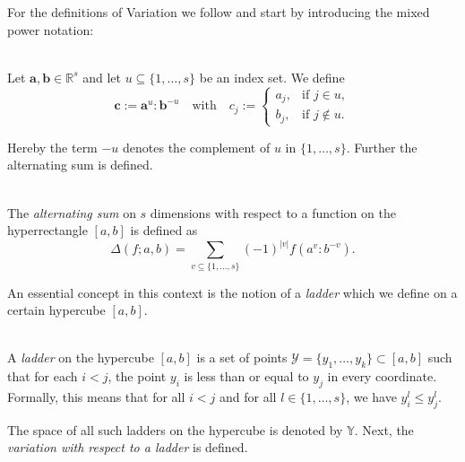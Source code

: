 For the definitions of Variation we follow \cite{owen2005multidimensional} and
start by introducing the mixed power notation:

\begin{definition} \ \\
    \label{def:component_merge}
    Let $\boldsymbol{a}, \boldsymbol{b} \in \mathbb{R}^s$ and let $u \subseteq
    \{1, \dots, s\}$ be an index set. We define
    \begin{equation*}
        \boldsymbol{c} := \boldsymbol{a}^u : \boldsymbol{b}^{-u}
        \quad \text{with} \quad
        c_j := 
        \begin{cases}
            a_j, & \text{if } j \in u, \\
            b_j, & \text{if } j \notin u.
        \end{cases}
    \end{equation*}
\end{definition}

Hereby the term $-u$ denotes the complement of $u$ in $\{1, \dots, s\}$. Further
the alternating sum is defined.

\begin{definition} \ \\
    The \emph{alternating sum} on $s$ dimensions with respect to a function on
    the hyperrectangle $[a,b]$ is defined as
    \begin{equation*}
        \Delta(f; a, b) = \sum_{v \subseteq \{1,\dots,s\}} (-1)^{|v|} f(a^v:b^{-v}).
    \end{equation*}
\end{definition}

An essential concept in this context is the notion of a \emph{ladder} which we
define on a certain hypercube $[a,b]$.

\begin{definition}[Ladder] \ \\
    A \emph{ladder} on the hypercube $[a,b]$ is a set of points $\mathcal{Y} =
    \{y_1, \dots, y_k\} \subset [a,b]$ such that for each $i < j$, the point
    $y_i$ is less than or equal to $y_j$ in every coordinate. Formally, this
    means that for all $i < j$ and for all $l \in \{1, \dots, s\}$, we have
    $y_i^l \leq y_j^l$.
\end{definition}

The space of all such ladders on the hypercube is denoted by $\mathbb{Y}$. Next,
the \emph{variation with respect to a ladder} is defined.

